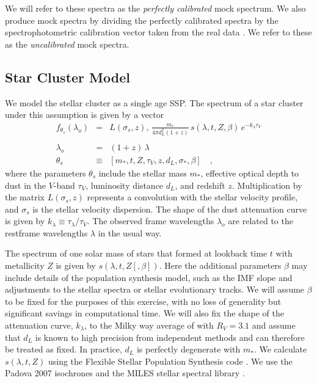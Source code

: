 \documentclass[iop,numberedappendix]{emulateapj}
\begin{document}
We will refer to these spectra as the \emph{perfectly calibrated} mock
spectrum. We also produce mock spectra by dividing the perfectly
calibrated spectra by the spectrophotometric calibration vector taken
from the real data \citep[][Fig\ref{fig:ggc_spectrum}]{schiavon05}.
We refer to these as the \emph{uncalibrated} mock spectra.

\subsection{Star Cluster Model}
\label{sec:cluster_model}
We model the stellar cluster as a single age SSP. The spectrum of a
star cluster under this assumption is given by a vector
\begin{eqnarray} \label{eq:StarModel}\displaystyle
f_{\theta_s}(\lambda_o) & = &
L(\sigma_s, z) ,\, \frac{m_*}{4\pi d_L^2(1+z)} \, s(\lambda, t, Z , \beta) \, e^ {-k_\lambda\tau_V} \\
\nonumber \\ 
\lambda_o & = & (1+z)\,\lambda 
\\
\theta_s & \equiv & \left[ m_*, t, Z, \tau_V, z, d_L, \sigma_*, \beta \right]
\quad ,
\end{eqnarray} where the
parameters $\theta_s$ include 
the stellar mass $m_*$, 
effective optical depth to dust in the $V$-band $\tau_V$, 
luminosity distance $d_L$,
and redshift $z$.
Multiplication by the matrix $L(\sigma_s, z)$ represents a convolution
with the stellar velocity profile,
and $\sigma_s$ is the stellar velocity dispersion. 
The shape of the dust attenuation curve is given by $k_\lambda \equiv
\tau_\lambda/\tau_V$.  
The observed frame wavelengths $\lambda_o$ are related to the
restframe wavelengths $\lambda$ in the usual way.

The spectrum of one solar mass of stars that formed at lookback time
$t$ with metallicity $Z$ is given by $s(\lambda, t, Z [, \beta])$.
Here the additional parameters $\beta$ may include details of the
population synthesis model, such as the IMF slope and adjustments to
the stellar spectra or stellar evolutionary tracks. We will assume
$\beta$ to be fixed for the purposes of this exercise, with no loss of
generality but significant savings in computational time.  We will
also fix the shape of the attenuation curve, $k_\lambda $, to the
Milky way average of \citet{CCM89} with $R_V=3.1$ and assume that
$d_L$ is known to high precision from independent methods and can
therefore be treated as fixed.  In practice, $d_L$ is perfectly
degenerate with $m_*$. We calculate $s(\lambda, t, Z)$ using the
Flexible Stellar Population Synthesis code \citep[FSPS][]{fsps}.  We
use the Padova 2007 isochrones \citep{girardi00, bertilli94, marigo07}
and the MILES stellar spectral library \citep{miles_I, miles_II,
miles_III}.
\end{document}
